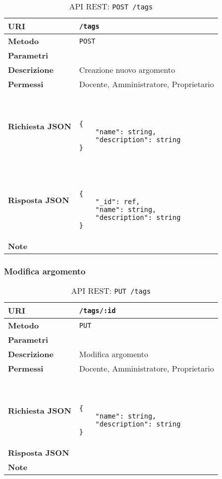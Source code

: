     \begin{table}[H]
    	\begin{center}
    		\begin{tabular}{p{} p{}}
    			\toprule
    			\textbf{URI} & \texttt{/tags} \\ \midrule
    			\textbf{Metodo} & \texttt{POST} \\ \midrule
    			\textbf{Parametri} & \\ \midrule
    			\textbf{Descrizione} & Creazione nuovo argomento \\ \midrule
    			\textbf{Permessi} & Docente, Amministratore, Proprietario  \\ \midrule
    			\textbf{Richiesta JSON} & \
	    			\begin{lstlisting}[basicstyle={\ttfamily}]	
{
	"name": string,
	"description": string
}
	    			\end{lstlisting}
    			\\ \midrule
    			\textbf{Risposta JSON} & \
                	\begin{lstlisting}[basicstyle={\ttfamily}]
{
    "_id": ref,
    "name": string,
    "description": string
}
      				\end{lstlisting}
					\\ \midrule
    			\textbf{Note} & \\
    			\bottomrule
    		\end{tabular}
    		\caption{API REST: \texttt{POST /tags}}
    	\end{center}
    \end{table}
    
    \subsubsection{Modifica argomento}
    
    \begin{table}[H]
    	\begin{center}
    		\begin{tabular}{p{} p{}}
    			\toprule
    			\textbf{URI} & \texttt{/tags/:id} \\ \midrule
    			\textbf{Metodo} & \texttt{PUT} \\ \midrule
    			\textbf{Parametri} & \\ \midrule
    			\textbf{Descrizione} & Modifica argomento \\ \midrule
    			\textbf{Permessi} & Docente, Amministratore, Proprietario  \\ \midrule
    			\textbf{Richiesta JSON} &\
	    			\begin{lstlisting}[basicstyle={\ttfamily}]
{
	"name": string,
	"description": string
}
	    			\end{lstlisting}
    			\\ \midrule
    			\textbf{Risposta JSON} & \\ \midrule
    			\textbf{Note} & \\
    			\bottomrule
    		\end{tabular}
    		\caption{API REST: \texttt{PUT /tags}}
    	\end{center}
    \end{table}
    
